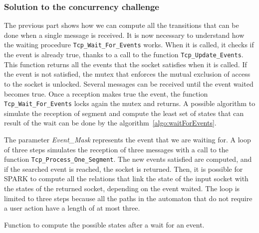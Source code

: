 \documentclass[runningheads]{llncs}
\let\Spark\lstinline
\begin{document}
\subsubsection{Solution to the concurrency challenge}

    The previous part shows how we can compute all the transitions that can be done when a single message is received.
    It is now necessary to understand how the waiting procedure \lstinline{Tcp_Wait_For_Events} works.
    When it is called, it checks if the event is already true, thanks to a call to the function \lstinline{Tcp_Update_Events}.
    This function returns all the events that the socket satisfies when it is called.
    If the event is not satisfied, the mutex that enforces the mutual exclusion of access to the socket is unlocked.
    Several messages can be received until the event waited becomes true.
    Once a reception makes true the event, the function \lstinline{Tcp_Wait_For_Events} locks again the mutex and returns.
    A possible algorithm to simulate the reception of segment and compute the least set of states that can result of the wait can be done
    by the algorithm~\ref{algo:waitForEvents}.

    The parameter \textit{Event\_Mask} represents the event that we are waiting for. A loop of three steps simulates the
    reception of three messages with a call to the function \Spark{Tcp_Process_One_Segment}. The new events
    satisfied are computed, and if the searched event is reached, the socket is returned.
    Then, it is possible for SPARK to compute all the relations that link the state of the input socket with the states
    of the returned socket, depending on the event waited.
    The loop is limited to three steps because all the paths in the automaton that do not require a user action have
    a length of at most three.

    \begin{algorithm}
        \caption{Function to compute the possible states after a wait for an event.}
        \label{algo:waitForEvents}
    \end{algorithm}
\end{document}

